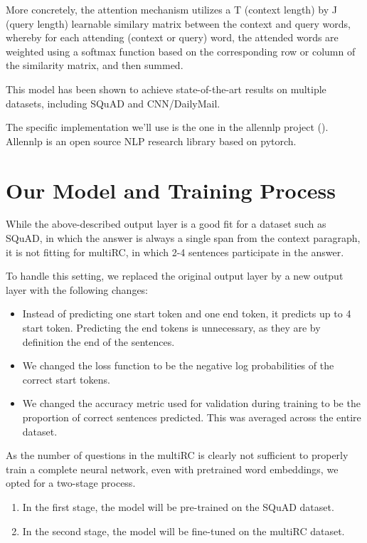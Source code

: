 \documentclass[12pt, a4paper]{article}
\begin{document}
\begin{multicols}{2}
			More concretely, the attention mechanism utilizes a T (context length) by J (query length) learnable similary matrix between the context and query words, whereby for each attending (context or query) word, the attended words are weighted using a softmax function based on the corresponding row or column of the similarity matrix, and then summed.
			
			This model has been shown to achieve state-of-the-art results on multiple datasets, including SQuAD and CNN/DailyMail.
			
			The specific implementation we'll use is the one in the allennlp project (\cite{Gardner2017ADS}). Allennlp is an open source NLP research library based on pytorch.
		
		\section{Our Model and Training Process}
		
			While the above-described output layer is a good fit for a dataset such as SQuAD, in which the answer is always a single span from the context paragraph, it is not fitting for multiRC, in which 2-4 sentences participate in the answer.
			
			To handle this setting, we replaced the original output layer by a new output layer with the following changes:
			\begin{itemize}
				\item Instead of predicting one start token and one end token, it predicts up to 4 start token. Predicting the end tokens is unnecessary, as they are by definition the end of the sentences.
				\item We changed the loss function to be the negative log probabilities of the correct start tokens.
				\item We changed the accuracy metric used for validation during training to be the proportion of correct sentences predicted. This was averaged across the entire dataset.
			\end{itemize}
		
			As the number of questions in the multiRC is clearly not sufficient to properly train a complete neural network, even with pretrained word embeddings, we opted for a two-stage process.
			\begin{enumerate}
				\item In the first stage, the model will be pre-trained on the SQuAD dataset.
				\item In the second stage, the model will be fine-tuned on the multiRC dataset.
			\end{enumerate}


\end{multicols}
\end{document}

